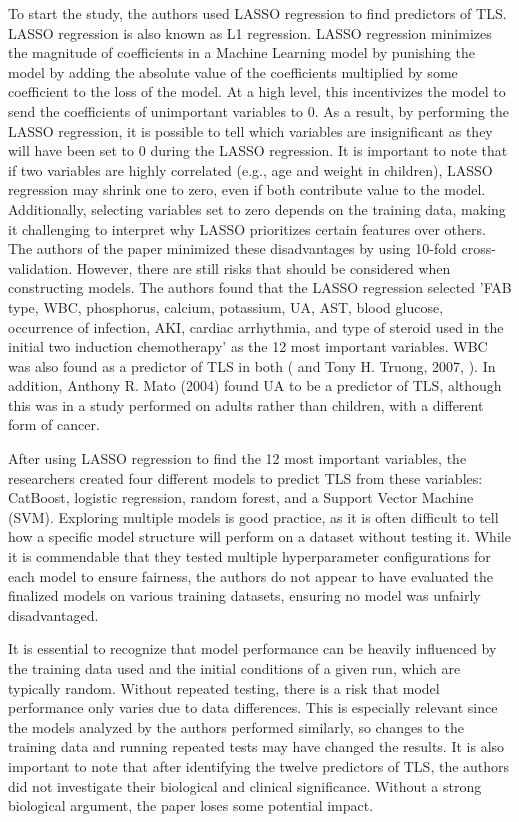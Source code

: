 \documentclass{article}
\begin{document}
To start the study, the authors used LASSO regression to find predictors of TLS. LASSO regression is also known as L1 regression. LASSO regression minimizes the magnitude of coefficients in a Machine Learning model by punishing the model by adding the absolute value of the coefficients multiplied by some coefficient to the loss of the model. At a high level, this incentivizes the model to send the coefficients of unimportant variables to 0. As a result, by performing the LASSO regression, it is possible to tell which variables are insignificant as they will have been set to 0 during the LASSO regression. It is important to note that if two variables are highly correlated (e.g., age and weight in children), LASSO regression may shrink one to zero, even if both contribute value to the model.
Additionally, selecting variables set to zero depends on the training data, making it challenging to interpret why LASSO prioritizes certain features over others. The authors of the paper minimized these disadvantages by using 10-fold cross-validation. However, there are still risks that should be considered when constructing models. The authors found that the LASSO regression selected 'FAB type, WBC, phosphorus, calcium, potassium, UA, AST, blood glucose, occurrence of infection, AKI, cardiac arrhythmia, and type of steroid used in the initial two induction chemotherapy' as the 12 most important variables. WBC was also found as a predictor of TLS in both ( \cite{xiao2024prediction} and Tony H. Truong, 2007, \cite{truong2007features}). In addition, Anthony R. Mato (2004) found UA to be a predictor of TLS, although this was in a study performed on adults rather than children, with a different form of cancer.

After using LASSO regression to find the 12 most important variables, the researchers created four different models to predict TLS from these variables: CatBoost, logistic regression, random forest, and a Support Vector Machine (SVM). Exploring multiple models is good practice, as it is often difficult to tell how a specific model structure will perform on a dataset without testing it. While it is commendable that they tested multiple hyperparameter configurations for each model to ensure fairness, the authors do not appear to have evaluated the finalized models on various training datasets, ensuring no model was unfairly disadvantaged. 

 It is essential to recognize that model performance can be heavily influenced by the training data used and the initial conditions of a given run, which are typically random. Without repeated testing, there is a risk that model performance only varies due to data differences. This is especially relevant since the models analyzed by the authors performed similarly, so changes to the training data and running repeated tests may have changed the results.
It is also important to note that after identifying the twelve predictors of TLS, the authors did not investigate their biological and clinical significance. Without a strong biological argument, the paper loses some potential impact.
\end{document}
